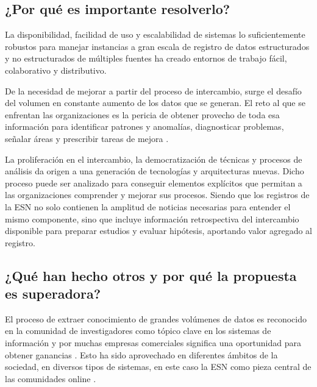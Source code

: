 \documentclass[a4paper,fleqn,spanish]{cas-dc}
\begin{document}

\subsection{¿Por qué es importante resolverlo?}\label{porque}

La disponibilidad, facilidad de uso y escalabilidad de sistemas lo
suficientemente robustos para manejar instancias a gran escala de registro de
datos estructurados y no estructurados de múltiples fuentes ha creado entornos
de trabajo fácil, colaborativo y distributivo.

De la necesidad de mejorar a partir del proceso de intercambio, surge el
desafío del volumen en constante aumento de los datos que se generan. El reto
al que se enfrentan las organizaciones es la pericia de obtener provecho de
toda esa información para identificar patrones y anomalías, diagnosticar
problemas, señalar áreas y prescribir tareas de mejora \cite{Qi_2017}.

La proliferación en el intercambio, la democratización de técnicas y procesos
de análisis da origen a una generación de tecnologías y arquitecturas nuevas.
Dicho proceso puede ser analizado para conseguir elementos explícitos que
permitan a las organizaciones comprender y mejorar sus procesos. Siendo que los
registros de la ESN no solo contienen la amplitud de noticias necesarias para
entender el mismo componente, sino que incluye información retrospectiva del
intercambio disponible para preparar estudios y evaluar hipótesis, aportando
valor agregado al registro.

\subsection{¿Qué han hecho otros y por qué la propuesta es superadora?}\label{otros}

El proceso de extraer conocimiento de grandes volúmenes de datos es reconocido
en la comunidad de investigadores como tópico clave en los sistemas de
información y por muchas empresas comerciales significa una oportunidad para
obtener ganancias \cite{Ahmed2017,Centobelli_2017,Cetto2018}. Esto ha sido
aprovechado en diferentes ámbitos de la sociedad, en diversos tipos de
sistemas, en este caso la ESN como pieza central de las comunidades online
\cite{Engelbrecht2019,Hao2021,Nisar_2019}.
\end{document}
